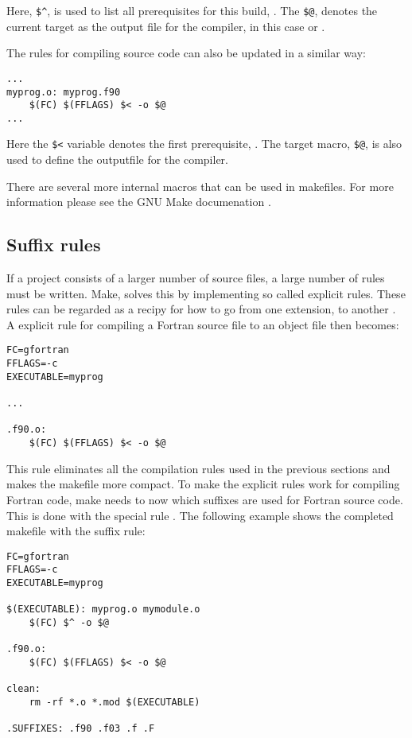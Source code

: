 Here, \verb|$^|, is used to list all prerequisites for this build, . The \verb|$@|, denotes the current target as the output file for the compiler, in this case  or .

The rules for compiling source code can also be updated in a similar way:

\begin{lstlisting}
...
myprog.o: myprog.f90 
	$(FC) $(FFLAGS) $< -o $@
...
\end{lstlisting}	

Here the \verb|$<| variable denotes the first prerequisite, . The target macro, \verb|$@|, is also used to define the outputfile for the compiler.

There are several more internal macros that can be used in makefiles. For more information please see the GNU Make documenation \cite{gnumake12}.

\subsection{Suffix rules}

If a project consists of a larger number of source files, a large number of rules must be written. Make, solves this by implementing so called explicit rules. These rules can be regarded as a recipy for how to go from one extension,  to another . A explicit rule for compiling a Fortran source file to an object file then becomes:

\mmode

\begin{lstlisting}
FC=gfortran
FFLAGS=-c
EXECUTABLE=myprog

...

.f90.o:
	$(FC) $(FFLAGS) $< -o $@
\end{lstlisting}

This rule eliminates all the compilation rules used in the previous sections and makes the makefile more compact. To make the explicit rules work for compiling Fortran code, make needs to now which suffixes are used for Fortran source code. This is done with the special rule . The following example shows the completed makefile with the suffix rule:

\begin{lstlisting}
FC=gfortran
FFLAGS=-c
EXECUTABLE=myprog

$(EXECUTABLE): myprog.o mymodule.o
	$(FC) $^ -o $@

.f90.o:
	$(FC) $(FFLAGS) $< -o $@
	
clean:
	rm -rf *.o *.mod $(EXECUTABLE)

.SUFFIXES: .f90 .f03 .f .F
\end{lstlisting}

